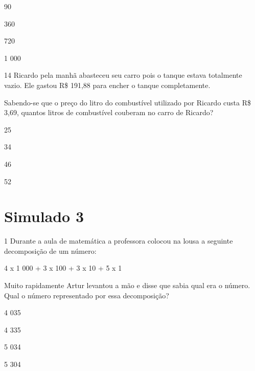 \begin{escolha}
\item
  90
\item
  360
\item
  720
\item
  1 000
\end{escolha}


\num{14} Ricardo pela manhã abasteceu seu carro pois o tanque estava
totalmente vazio. Ele gastou R\$ 191,88 para encher o tanque
completamente.

Sabendo-se que o preço do litro do combustível utilizado por Ricardo
custa R\$ 3,69, quantos litros de combustível couberam no carro de
Ricardo?

\begin{escolha}
\item
  25
\item
  34
\item
  46
\item
  52
\end{escolha}


\chapter{Simulado 3}

\num{1} Durante a aula de matemática a professora colocou na lousa a
seguinte decomposição de um número:

4 x 1 000 + 3 x 100 + 3 x 10 + 5 x 1

Muito rapidamente Artur levantou a mão e disse que sabia qual era o
número. Qual o número representado por essa decomposição?

\begin{escolha}
\item
  4 035
\item
  4 335
\item
  5 034
\item
  5 304
\end{escolha}

